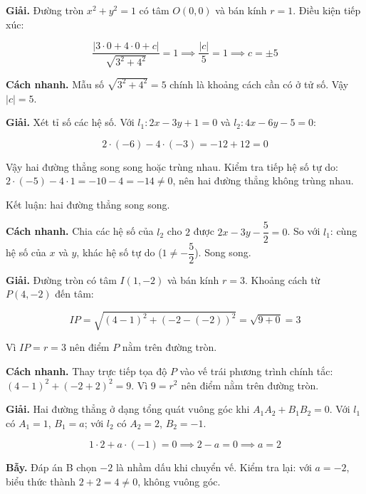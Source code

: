 \documentclass[11pt, a4paper]{article}
\begin{document}
\begin{dapan}[9 — Đáp án C]
\textbf{Giải.} Đường tròn $x^2 + y^2 = 1$ có tâm $O(0,0)$ và bán kính $r = 1$. Điều kiện tiếp xúc:

$$\frac{|3 \cdot 0 + 4 \cdot 0 + c|}{\sqrt{3^2 + 4^2}} = 1 \implies \frac{|c|}{5} = 1 \implies c = \pm 5$$

\textbf{Cách nhanh.} Mẫu số $\sqrt{3^2 + 4^2} = 5$ chính là khoảng cách cần có ở tử số. Vậy $|c| = 5$.
\end{dapan}

\begin{dapan}[10 — Đáp án C]
\textbf{Giải.} Xét tỉ số các hệ số. Với $l_1: 2x - 3y + 1 = 0$ và $l_2: 4x - 6y - 5 = 0$:

$$2 \cdot (-6) - 4 \cdot (-3) = -12 + 12 = 0$$

Vậy hai đường thẳng song song hoặc trùng nhau. Kiểm tra tiếp hệ số tự do: $2 \cdot (-5) - 4 \cdot 1 = -10 - 4 = -14 \ne 0$, nên hai đường thẳng không trùng nhau.

Kết luận: hai đường thẳng song song.

\textbf{Cách nhanh.} Chia các hệ số của $l_2$ cho $2$ được $2x - 3y - \dfrac{5}{2} = 0$. So với $l_1$: cùng hệ số của $x$ và $y$, khác hệ số tự do ($1 \ne -\dfrac{5}{2}$). Song song.
\end{dapan}

\begin{dapan}[11 — Đáp án A]
\textbf{Giải.} Đường tròn có tâm $I(1, -2)$ và bán kính $r = 3$. Khoảng cách từ $P(4, -2)$ đến tâm:

$$IP = \sqrt{(4-1)^2 + (-2-(-2))^2} = \sqrt{9 + 0} = 3$$

Vì $IP = r = 3$ nên điểm $P$ nằm trên đường tròn.

\textbf{Cách nhanh.} Thay trực tiếp tọa độ $P$ vào vế trái phương trình chính tắc: $(4-1)^2 + (-2+2)^2 = 9$. Vì $9 = r^2$ nên điểm nằm trên đường tròn.
\end{dapan}

\begin{dapan}[12 — Đáp án A]
\textbf{Giải.} Hai đường thẳng ở dạng tổng quát vuông góc khi $A_1A_2 + B_1B_2 = 0$. Với $l_1$ có $A_1 = 1$, $B_1 = a$; với $l_2$ có $A_2 = 2$, $B_2 = -1$.

$$1 \cdot 2 + a \cdot (-1) = 0 \implies 2 - a = 0 \implies a = 2$$

\textbf{Bẫy.} Đáp án B chọn $-2$ là nhầm dấu khi chuyển vế. Kiểm tra lại: với $a = -2$, biểu thức thành $2 + 2 = 4 \ne 0$, không vuông góc.
\end{dapan}
\end{document}
